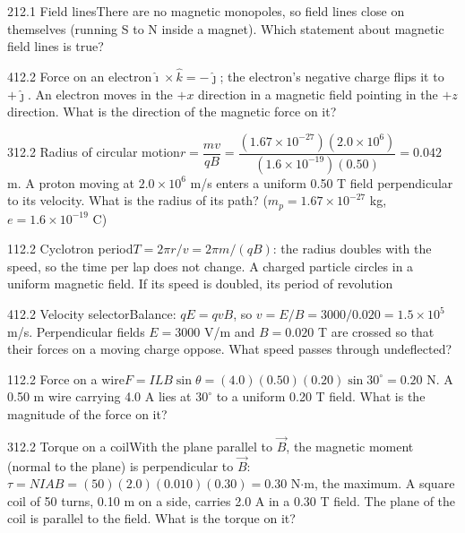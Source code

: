 \documentclass[11pt]{article}
\begin{document}
\begin{q}{2}{12.1 Field lines}{There are no magnetic monopoles, so field lines close on themselves (running S to N inside a magnet).}
Which statement about magnetic field lines is true?
\end{q}
\begin{q}{4}{12.2 Force on an electron}{$\hat\imath\times\hat k = -\hat\jmath$; the electron's negative charge flips it to $+\hat\jmath$.}
An electron moves in the $+x$ direction in a magnetic field pointing in the $+z$ direction. What is the direction of the magnetic force on it?
\end{q}
\begin{q}{3}{12.2 Radius of circular motion}{$r = \dfrac{mv}{qB} = \dfrac{(1.67\times10^{-27})(2.0\times10^6)}{(1.6\times10^{-19})(0.50)} = 0.042$ m.}
A proton moving at $2.0\times10^6$ m/s enters a uniform 0.50 T field perpendicular to its velocity. What is the radius of its path? ($m_p = 1.67\times10^{-27}$ kg, $e = 1.6\times10^{-19}$ C)
\end{q}
\begin{q}{1}{12.2 Cyclotron period}{$T = 2\pi r/v = 2\pi m/(qB)$: the radius doubles with the speed, so the time per lap does not change.}
A charged particle circles in a uniform magnetic field. If its speed is doubled, its period of revolution
\end{q}
\begin{q}{4}{12.2 Velocity selector}{Balance: $qE = qvB$, so $v = E/B = 3000/0.020 = 1.5\times10^5$ m/s.}
Perpendicular fields $E = 3000$ V/m and $B = 0.020$ T are crossed so that their forces on a moving charge oppose. What speed passes through undeflected?
\end{q}
\begin{q}{1}{12.2 Force on a wire}{$F = ILB\sin\theta = (4.0)(0.50)(0.20)\sin 30^\circ = 0.20$ N.}
A 0.50 m wire carrying 4.0 A lies at $30^\circ$ to a uniform 0.20 T field. What is the magnitude of the force on it?
\end{q}
\begin{q}{3}{12.2 Torque on a coil}{With the plane parallel to $\vec B$, the magnetic moment (normal to the plane) is perpendicular to $\vec B$: $\tau = NIAB = (50)(2.0)(0.010)(0.30) = 0.30$ N$\cdot$m, the maximum.}
A square coil of 50 turns, 0.10 m on a side, carries 2.0 A in a 0.30 T field. The plane of the coil is parallel to the field. What is the torque on it?
\end{q}
\end{document}

